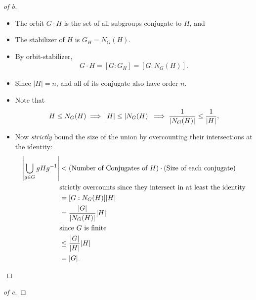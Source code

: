 \begin{solution}
\begin{proof}[of b]
\begin{itemize}
\item
  The orbit \(G\cdot H\) is the set of all subgroups conjugate to \(H\),
  and
\item
  The stabilizer of \(H\) is \(G_H = N_G(H)\).
\item
  By orbit-stabilizer,
  \begin{align*}
  G\cdot H = [G: G_H] = [G: N_G(H)]
  .\end{align*}
\item
  Since \({\left\lvert {H} \right\rvert} = n\), and all of its conjugate
  also have order \(n\).
\item
  Note that
  \begin{align*}
  H\leq N_G(H) \implies {\left\lvert {H} \right\rvert} \leq {\left\lvert {N_G(H)} \right\rvert} \implies {1\over {\left\lvert {N_G(H)} \right\rvert}} \leq {1\over {\left\lvert {H} \right\rvert}}
  ,\end{align*}
\item
  Now \emph{strictly} bound the size of the union by overcounting their
  intersections at the identity:
  \begin{align*}
  {\left\lvert {\displaystyle\bigcup_{g\in G}gHg^{-1}} \right\rvert} 
  &< (\text{Number of Conjugates of } H) \cdot (\text{Size of each conjugate}) \\ 
  & \text{strictly overcounts since they intersect in at least the identity} \\
  &= [G: N_G(H)] {\left\lvert {H} \right\rvert} \\
  &= {{\left\lvert {G} \right\rvert} \over {\left\lvert {N_G(H)} \right\rvert}} {\left\lvert {H} \right\rvert} \\
  & \text{since $G$ is finite} \\
  &\leq {{\left\lvert {G} \right\rvert} \over {\left\lvert {H} \right\rvert}} {\left\lvert {H} \right\rvert} \\
  &= {\left\lvert {G} \right\rvert}
  .\end{align*}
\end{itemize}

\end{proof}

\begin{proof}[of c]

\envlist


\end{proof}
\end{solution}
